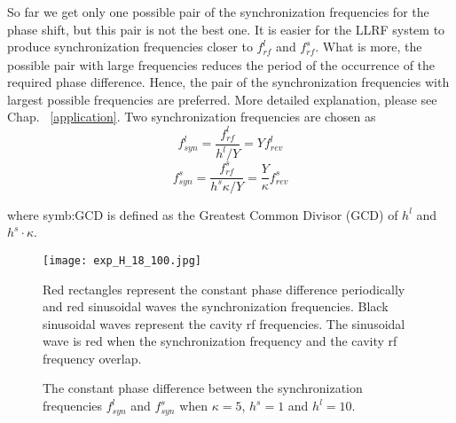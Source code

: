 So far we get only one possible pair of the synchronization frequencies for the phase shift, but this pair is not the best one. It is easier for the LLRF system to produce synchronization frequencies closer to $f_{\mathit{rf}}^{l}$ and $f_{\mathit{rf}}^{s}$. What is more, the possible pair with large frequencies reduces the period of the occurrence of the required phase difference. Hence, the pair of the synchronization frequencies with largest possible frequencies are preferred. More detailed explanation, please see Chap. ~\ref{application}. Two synchronization frequencies are chosen as
\begin{equation}
f_{\mathit{syn}}^{l}=\frac{f_{\mathit{rf}}^{l}}{h^{l}/Y}=Yf_{\mathit{rev}}^{l} \label{synch_freq1}
\end{equation}
\begin{equation}
f_{\mathit{syn}}^{s}=\frac{f_{\mathit{rf}}^{s}}{h^{s}\kappa/Y}=\frac{Y}{\kappa}f_{\mathit{rev}}^{s} \label{synch_freq2}
\end{equation}

where \gls{symb:GCD} is defined as the Greatest Common Divisor (\gls{GCD}) of $h^l$ and $h^s \cdot \kappa$.

\begin{figure}[!htb]
   \centering   
   \texttt{[image: exp\_H\_18\_100.jpg]}
   \caption{The constant phase difference between the synchronization frequencies $f_{\mathit{syn}}^{l}$ and $f_{\mathit{syn}}^{s}$ when $\kappa=5$, $h^s=1$ and $h^l=10$. }{Red rectangles represent the constant phase difference periodically and red sinusoidal waves the synchronization frequencies. Black sinusoidal waves represent the cavity rf frequencies. The sinusoidal wave is red when the synchronization frequency and the cavity rf frequency overlap.}
   \label{exp_H_18_100}
\end{figure} 

